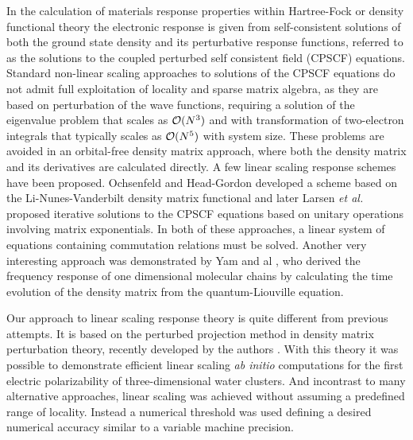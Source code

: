 \documentclass[prl,aps,twocolumn,showpacs,twocolumngrid,superbib]{revtex4}
\begin{document}
 In the calculation of materials response properties within 
 Hartree-Fock or density functional theory the electronic
 response is given from self-consistent solutions of both
 the ground state density and its perturbative response functions,
 referred to as the solutions to the coupled perturbed self consistent 
 field (CPSCF) equations.
 Standard non-linear scaling approaches to solutions of the CPSCF equations 
 \cite{Pople_1979,Sekino_1986,Dupuis_1991} do not admit full exploitation 
 of locality and sparse matrix algebra, as they are based on perturbation 
 of the wave functions, requiring a solution of the eigenvalue problem
 that scales as ${\cal O}(N^3)$ and with transformation of two-electron
 integrals that typically scales as ${\cal O}(N^5)$ with system size.
 These problems are avoided in an orbital-free density matrix approach, 
 where both the density matrix and its derivatives are calculated directly.
 A few linear scaling response schemes have been proposed.
 Ochsenfeld and Head-Gordon developed a scheme based on the
 Li-Nunes-Vanderbilt density matrix functional \cite{Ochsenfeld_1997}
 and later Larsen {\em et al.} \cite{Helgaker_2001} proposed iterative 
 solutions to the CPSCF equations based on unitary operations
 involving matrix exponentials. In both of these approaches, a linear 
 system of equations containing commutation relations must be solved.
 Another very interesting approach was demonstrated by Yam and al
 \cite{CYam03,CYam03a}, who derived the frequency response of one 
 dimensional molecular chains by calculating the time evolution of 
 the density matrix from the quantum-Liouville equation.

 Our approach to linear scaling response theory is quite different 
 from previous attempts. It is based on the perturbed projection
 method in density matrix perturbation theory, recently developed
 by the authors \cite{Niklasson04,Weber04}. With this theory it
 was possible to demonstrate efficient linear scaling {\em ab initio}
 computations for the first electric polarizability of three-dimensional 
 water clusters. And incontrast to many alternative approaches, linear scaling 
 was achieved without assuming a predefined range of locality. Instead a 
 numerical threshold was used defining a desired numerical accuracy similar
 to a variable machine precision.

\end{document}
